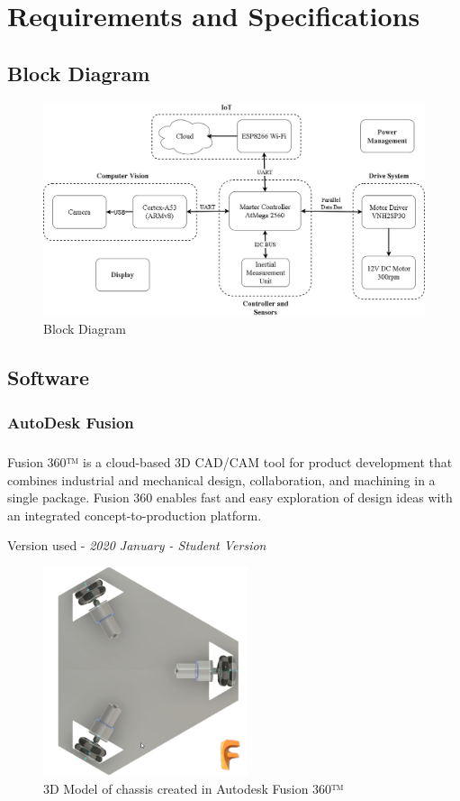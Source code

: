\chapter{Requirements and Specifications}
\section{Block Diagram}

\begin{figure}[H]
\centering
\includegraphics[width = \textwidth]{project/images/blockdiagram.png}
\caption{Block Diagram} \label{blockdiagram}
\end{figure}
\newpage

\section{Software}
\subsection{AutoDesk Fusion}
\paragraph{}Fusion 360™ is a cloud-based 3D CAD/CAM tool for product development that combines industrial and mechanical design, collaboration, and machining in a single package. Fusion 360 enables fast and easy exploration of design ideas with an integrated concept-to-production platform. %

Version used - \textit{2020 January - Student Version}

\begin{figure}[H]
\centering
\includegraphics[width = 6cm]{project/images/chassis_3d_model.png}
\caption{3D Model of chassis created in Autodesk Fusion 360™} \label{chassis}
\end{figure}

